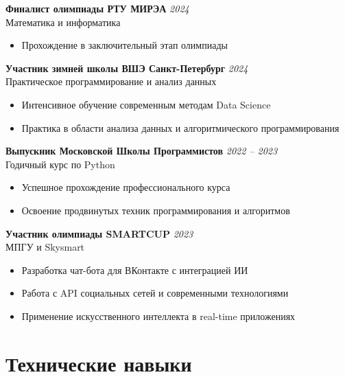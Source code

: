 \documentclass[11pt,a4paper]{article}
\newcommand{\hlteal}[1]{\textcolor{pastelteal}{#1}}
\newcommand{\achievement}[4]{
  \par\noindent
  \begin{minipage}{\textwidth}
  \textbf{\color{primarycolor}#1} \hfill {\color{secondarycolor}\textit{#2}}\\
  {\color{secondarycolor}#3}
  \vspace{2pt}

  #4
  \end{minipage}
  \vspace{4pt}
}
\begin{document}
\achievement
  {Финалист олимпиады РТУ МИРЭА}
  {2024}
  {Математика и информатика}
  {
    \begin{itemize}
      \item Прохождение в заключительный этап олимпиады
    \end{itemize}
  }

\achievement
  {Участник зимней школы ВШЭ Санкт-Петербург}
  {2024}
  {Практическое программирование и анализ данных}
  {
    \begin{itemize}
      \item Интенсивное обучение современным методам Data Science
      \item Практика в области анализа данных и алгоритмического программирования
    \end{itemize}
  }

\achievement
  {Выпускник Московской Школы Программистов}
  {2022 -- 2023}
  {Годичный курс по Python}
  {
    \begin{itemize}
      \item Успешное прохождение профессионального курса
      \item Освоение продвинутых техник программирования и алгоритмов
    \end{itemize}
  }

\achievement
  {Участник олимпиады SMARTCUP}
  {2023}
  {МПГУ и Skysmart}
  {
    \begin{itemize}
      \item Разработка \hlteal{чат-бота для ВКонтакте} с интеграцией ИИ
      \item Работа с API социальных сетей и современными технологиями
      \item Применение искусственного интеллекта в real-time приложениях
    \end{itemize}
  }

\newpage

\section{Технические навыки}
\end{document}

